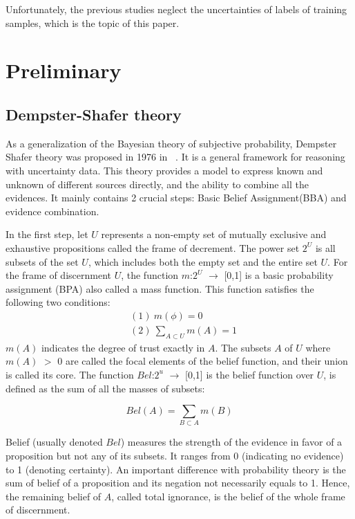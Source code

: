 \documentclass[runningheads]{llncs}
\begin{document}
Unfortunately, the previous studies neglect the uncertainties of labels of training samples, which is the topic of this paper. 

\section{Preliminary}
\subsection{Dempster-Shafer theory}
As a generalization of the Bayesian theory of subjective probability, Dempster Shafer theory was proposed in 1976 in ~\cite{ref_article10}. It is a general framework for reasoning with uncertainty data. This theory provides a model to express known and unknown  of different sources directly, and the ability to combine all the evidences. It mainly contains 2 crucial steps: Basic Belief Assignment(BBA) and evidence combination.

In the first step, let $U$ represents a non-empty set of mutually exclusive and exhaustive propositions called the frame of decrement. The power set $2^{U}$ is all subsets of the set $U$, which includes both the empty set  and the entire set $U$. For the frame of discernment $U$, the function $m$:$2^{U}$ $\rightarrow$ [0,1] is a basic probability assignment (BPA) also called a mass function. This function satisfies the following two conditions: 
\begin{equation}
\begin{split}
&(1)\ m(\phi) = 0\\&(2)\ \sum_{A\subset U}m(A) = 1
\end{split}
\end{equation}
$m(A)$ indicates the degree of trust exactly in $A$. The subsets $A$ of $U$ where $m(A)$ $>$ 0 are called the focal elements of the belief function, and their union is called its core. The function $Bel$:$2^{u}$ $\rightarrow$ [0,1] is the belief function over $U$, is defined as the sum of all the masses of subsets:

\begin{equation}
Bel(A) = \sum_{B\subset A}m(B)
\end{equation}

Belief (usually denoted $Bel$) measures the strength of the evidence in favor of a proposition but not any of its subsets. It ranges from 0 (indicating no evidence) to 1 (denoting certainty). An important difference with probability theory is the sum of belief of a proposition and its negation not necessarily equals to 1. Hence, the remaining belief of $A$, called total ignorance, is the belief of the whole frame of discernment.
\end{document}
